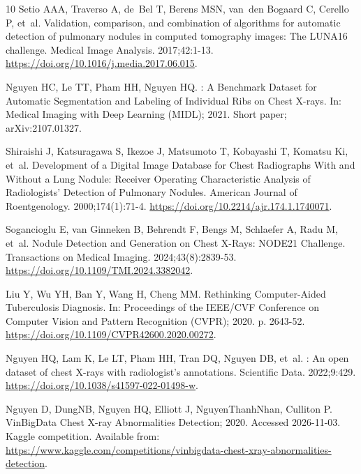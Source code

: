 \begin{thebibliography}{10}
Setio AAA, Traverso A, de~Bel T, Berens MSN, van~den Bogaard C, Cerello P,
  et~al.
\newblock Validation, comparison, and combination of algorithms for automatic
  detection of pulmonary nodules in computed tomography images: The {LUNA16}
  challenge.
\newblock Medical Image Analysis. 2017;42:1-13.
\newblock \url{https://doi.org/10.1016/j.media.2017.06.015}.

Nguyen HC, Le TT, Pham HH, Nguyen HQ.
: A Benchmark Dataset for Automatic Segmentation and
  Labeling of Individual Ribs on Chest {X}-rays.
\newblock In: Medical Imaging with Deep Learning ({MIDL}); 2021. Short paper;
  arXiv:2107.01327.

Shiraishi J, Katsuragawa S, Ikezoe J, Matsumoto T, Kobayashi T, Komatsu Ki,
  et~al.
\newblock Development of a Digital Image Database for Chest Radiographs With
  and Without a Lung Nodule: Receiver Operating Characteristic Analysis of
  Radiologists' Detection of Pulmonary Nodules.
\newblock American Journal of Roentgenology. 2000;174(1):71-4.
\newblock \url{https://doi.org/10.2214/ajr.174.1.1740071}.

Sogancioglu E, van Ginneken B, Behrendt F, Bengs M, Schlaefer A, Radu M, et~al.
\newblock Nodule Detection and Generation on Chest {X}-Rays: {NODE21}
  Challenge.
 Transactions on Medical Imaging. 2024;43(8):2839-53.
\newblock \url{https://doi.org/10.1109/TMI.2024.3382042}.

Liu Y, Wu YH, Ban Y, Wang H, Cheng MM.
\newblock Rethinking Computer-Aided Tuberculosis Diagnosis.
\newblock In: Proceedings of the {IEEE/CVF} Conference on Computer Vision and
  Pattern Recognition ({CVPR}); 2020. p. 2643-52.
\newblock \url{https://doi.org/10.1109/CVPR42600.2020.00272}.

Nguyen HQ, Lam K, Le LT, Pham HH, Tran DQ, Nguyen DB, et~al.
: An open dataset of chest {X}-rays with radiologist's
  annotations.
\newblock Scientific Data. 2022;9:429.
\newblock \url{https://doi.org/10.1038/s41597-022-01498-w}.

Nguyen D, {DungNB}, Nguyen HQ, Elliott J, {NguyenThanhNhan}, Culliton P.
  {VinBigData} Chest {X}-ray Abnormalities Detection; 2020.
\newblock Accessed 2026-11-03.
\newblock Kaggle competition.
\newblock Available from:
  \url{https://www.kaggle.com/competitions/vinbigdata-chest-xray-abnormalities-detection}.


\end{thebibliography}
